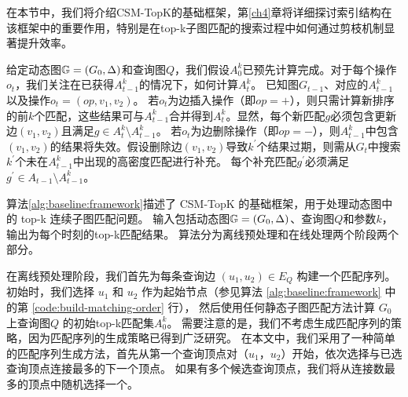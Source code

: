 在本节中，我们将介绍CSM-TopK的基础框架，第\ref{ch4}章将详细探讨索引结构在该框架中的重要作用，特别是在top-k子图匹配的搜索过程中如何通过剪枝机制显著提升效率。


给定动态图$\mathbb{G}=(G_0, \Delta)$和查询图$Q$，我们假设$A_0^k$已预先计算完成。对于每个操作$o_t$，我们关注在已获得$A_{t-1}^k$的情况下，如何计算$A_t^k$。
已知图$G_{t-1}$、对应的$A_{t-1}^k$以及操作$o_t=(op, v_1, v_2)$。
若$o_t$为边插入操作（即$op=+$），则只需计算新排序的前$k$个匹配，这些结果可与$A_{t-1}^k$合并得到$A_t^k$。显然，每个新匹配$g$必须包含更新边$(v_1, v_2)$且满足$g\in A_t^k\setminus A_{t-1}^k$。
若$o_t$为边删除操作（即$op=-$），则$A_{t-1}^k$中包含$(v_1, v_2)$的结果将失效。假设删除边$(v_1, v_2)$导致$k^\prime$个结果过期，则需从$G_t$中搜索$k^\prime$个未在$A_{t-1}^k$中出现的高密度匹配进行补充。
每个补充匹配$g^\prime$必须满足$g^\prime \in A_{t-1} \setminus A_{t-1}^k$。

算法\ref{alg:baseline:framework}描述了 CSM-TopK 的基础框架，用于处理动态图中的 top-k 连续子图匹配问题。
输入包括动态图$\mathbb{G}=(G_0, \Delta)$、查询图$Q$和参数$k$，输出为每个时刻的top-k匹配结果。
算法分为离线预处理和在线处理两个阶段两个部分。

在离线预处理阶段，我们首先为每条查询边 $(u_1, u_2) \in E_Q$ 构建一个匹配序列。初始时，我们选择 $u_1$ 和 $u_2$ 作为起始节点（参见算法 \ref{alg:baseline:framework} 中的第 \ref{code:build-matching-order} 行），
然后使用任何静态子图匹配方法计算 $G_0$ 上查询图$Q$ 的初始top-k匹配集$A_0^k$。
需要注意的是，我们不考虑生成匹配序列的策略，因为匹配序列的生成策略已得到广泛研究。
在本文中，我们采用了一种简单的匹配序列生成方法，首先从第一个查询顶点对（$u_1$，$u_2$）开始，依次选择与已选查询顶点连接最多的下一个顶点。
如果有多个候选查询顶点，我们将从连接数最多的顶点中随机选择一个。

